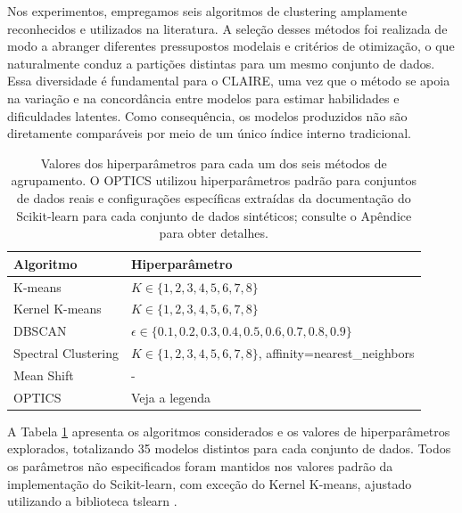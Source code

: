 Nos experimentos, empregamos seis algoritmos de clustering amplamente reconhecidos e utilizados na literatura. A seleção desses métodos foi realizada de modo a abranger diferentes pressupostos modelais e critérios de otimização, o que naturalmente conduz a partições distintas para um mesmo conjunto de dados. Essa diversidade é fundamental para o \gls{CLAIRE}, uma vez que o método se apoia na variação e na concordância entre modelos para estimar habilidades e dificuldades latentes. Como consequência, os modelos produzidos não são diretamente comparáveis por meio de um único índice interno tradicional.


\begin{table}[!htb]

    \centering
    \caption{Valores dos hiperparâmetros para cada um dos seis métodos de agrupamento. O OPTICS utilizou hiperparâmetros padrão para conjuntos de dados reais e configurações específicas extraídas da documentação do Scikit-learn para cada conjunto de dados sintéticos; consulte o Apêndice para obter detalhes.}
    \begin{tabular}{ll}
    \toprule
       Algoritmo  & Hiperparâmetro\\
    \midrule
       K-means  & $K \in \{1, 2, 3, 4, 5, 6, 7, 8\}$\\
       Kernel K-means  & $K \in \{1, 2, 3, 4, 5, 6, 7, 8\}$\\
       DBSCAN  & $\epsilon \in \{0.1, 0.2, 0.3,0.4, 0.5, 0.6, 0.7, 0.8, 0.9\}$\\
       Spectral Clustering  & $K \in \{1, 2, 3, 4, 5, 6, 7, 8\}$, affinity=\textsf{nearest\_neighbors}\\
       Mean Shift  & -\\
       OPTICS  & Veja a legenda\\
    \midrule
    \end{tabular}
    \label{tab:hyperparams}
    
\end{table}

A Tabela \ref{tab:hyperparams} apresenta os algoritmos considerados e os valores de hiperparâmetros explorados, totalizando 35 modelos distintos para cada conjunto de dados. Todos os parâmetros não especificados foram mantidos nos valores padrão da implementação do Scikit-learn, com exceção do Kernel K-means, ajustado utilizando a biblioteca tslearn \cite{tslearn}.

